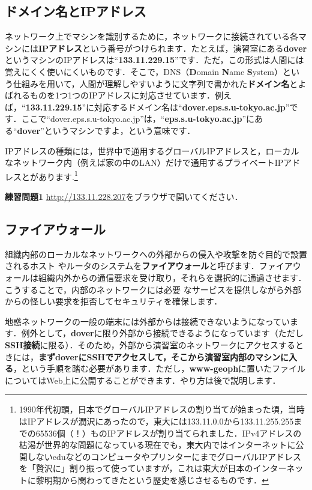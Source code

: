 \documentclass{jarticle}
\begin{document}
\subsection{ドメイン名とIPアドレス}
ネットワーク上でマシンを識別するために，ネットワークに接続されている各マシンには{\bf IPアドレス}という番号がつけられます．たとえば，演習室にある{\bf dover}というマシンのIPアドレスは“{\bf 133.11.229.15}”です．ただ，この形式は人間には覚えにくく使いにくいものです．そこで，DNS（\textbf{D}omain \textbf{N}ame \textbf{S}ystem）という仕組みを用いて，人間が理解しやすいように文字列で書かれた{\bf ドメイン名}とよばれるものを1つ1つのIPアドレスに対応させています．例えば，“{\bf 133.11.229.15}”に対応するドメイン名は“{\bf dover.eps.s.u-tokyo.ac.jp}”です．ここで“dover.eps.s.u-tokyo.ac.jp”は，“{\bf eps.s.u-tokyo.ac.jp}”にある“{\bf dover}”というマシンですよ，という意味です．

IPアドレスの種類には，世界中で通用するグローバルIPアドレスと，ローカルなネットワーク内（例えば家の中のLAN）だけで通用するプライベートIPアドレスとがあります.\footnote{1990年代初頭，日本でグローバルIPアドレスの割り当てが始まった頃，当時はIPアドレスが潤沢にあったので，東大には133.11.0.0から133.11.255.255までの65536個（！）ものIPアドレスが割り当てられました．IPv4アドレスの枯渇が世界的な問題になっている現在でも，東大内ではインターネットに公開しないeduなどのコンピュータやプリンターにまでグローバルIPアドレスを「贅沢に」割り振って使っていますが，これは東大が日本のインターネットに黎明期から関わってきたという歴史を感じさせるものです．}

\begin{itembox}[l]{\textbf{練習問題1}}
\url{http://133.11.228.207}をブラウザで開いてください．
\end{itembox}

\subsection{ファイアウォール}
組織内部のローカルなネットワークへの外部からの侵入や攻撃を防ぐ目的で設置されるホスト
やルータのシステムを{\bf ファイアウォール}と呼びます．ファイアウォールは組織内外からの通信要求を受け取り，それらを選択的に通過させます．こうすることで，内部のネットワークには必要
なサービスを提供しながら外部からの怪しい要求を拒否してセキュリティを確保します．

地惑ネットワークの一般の端末には外部からは接続できないようになっています．例外として，{\bf dover}に限り外部から接続できるようになっています（ただし{\bf SSH接続}に限る）．そのため，外部から演習室のネットワークにアクセスするときには，{\bf まずdoverにSSHでアクセスして，そこから演習室内部のマシンに入る}，という手順を踏む必要があります．ただし，{\bf www-geoph}に置いたファイルについてはWeb上に公開することができます．やり方は後で説明します．
\end{document}
